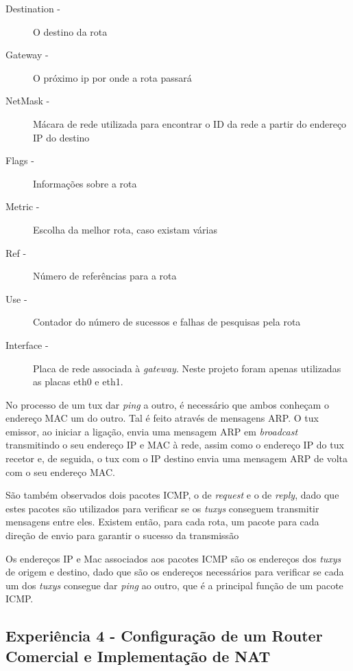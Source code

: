 \documentclass[11pt]{article}
\begin{document}
\begin{description}

\item[Destination -] O destino da rota

\item[Gateway -] O próximo ip por onde a rota passará

\item[NetMask -] Mácara de rede utilizada para encontrar o ID da rede a partir do endereço IP do destino

\item[Flags -] Informações sobre a rota

\item[Metric -] Escolha da melhor rota, caso existam várias

\item[Ref -] Número de referências para a rota

\item[Use -] Contador do número de sucessos e falhas de pesquisas pela rota

\item[Interface -] Placa de rede associada à \textit{gateway}. Neste projeto foram apenas utilizadas as placas eth0 e eth1.

\end{description}

No processo de um tux dar \textit{ping} a outro, é necessário que ambos conheçam o endereço MAC um do outro.
Tal é feito através de mensagens ARP. O tux emissor, ao iniciar a ligação, envia uma mensagem ARP em \textit{broadcast} transmitindo o seu endereço IP e MAC à rede, assim como o endereço IP do tux recetor e, de seguida, o tux com o IP destino envia uma mensagem ARP de volta com o seu endereço MAC.

São também observados dois pacotes ICMP, o de \textit{request} e o de \textit{reply}, dado que estes pacotes são utilizados para verificar se os \textit{tuxys} conseguem transmitir mensagens entre eles. Existem então, para cada rota, um pacote para cada direção de envio para garantir o sucesso da transmissão


Os endereços IP e Mac associados aos pacotes ICMP são os endereços dos \textit{tuxys} de origem e destino, dado que são os endereços necessários para verificar se cada um dos \textit{tuxys} consegue dar \textit{ping} ao outro, que é a principal função de um pacote ICMP. 

\subsection{Experiência 4 - Configuração de um Router Comercial e Implementação de NAT}
\end{document}

